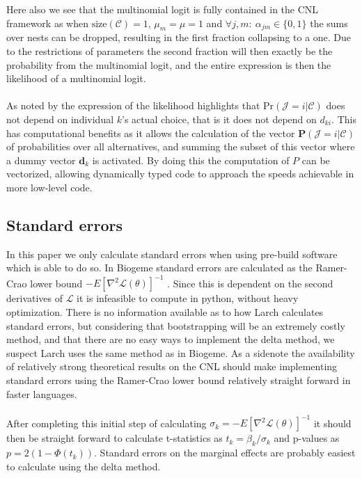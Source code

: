 Here also we see that the multinomial logit is fully contained in the CNL framework as when $\textrm{size}(\mathcal{C}) = 1$, $\mu_m = \mu = 1$ and $\forall j,m: \ \alpha_{jm} \in \{0,1\}$ the sums over nests can be dropped, resulting in the first fraction collapsing to a one. Due to the restrictions of parameters the second fraction will then exactly be the probability from the multinomial logit, and the entire expression is then the likelihood of a multinomial logit.
\\ \\
As noted by \citet{newman_computational_2018} the expression of the likelihood highlights that $\textrm{Pr}(\mathcal{J} = i| \mathcal{C})$ does not depend on individual $k$'s  actual choice, that is it does not depend on $d_{ki}$. This has computational benefits as it allows the calculation of the vector $\bm{P}(\mathcal{J} = i| \mathcal{C})$ of probabilities over all alternatives, and summing the subset of this vector where a dummy vector $\bm{d}_{k}$ is activated. By doing this the computation of $P$ can be vectorized, allowing dynamically typed code to approach the speeds achievable in more low-level code.

\subsection{Standard errors}
In this paper we only calculate standard errors when using pre-build software which is able to do so. In Biogeme standard errors are calculated as the Ramer-Crao lower bound $-E[\nabla^2 \mathcal{L}(\theta)]^{-1}$ \citep{bierlaire_pythonbiogeme:_2016}. Since this is dependent on the second derivatives of $\mathcal{L}$ it is infeasible to compute in python, without heavy optimization. There is no information available as to how Larch calculates standard errors, but considering that bootstrapping will be an extremely costly method, and that there are no easy ways to implement the delta method, we suspect Larch uses the same method as in Biogeme. As a sidenote the availability of relatively strong theoretical results on the CNL should make implementing standard errors using the Ramer-Crao lower bound relatively straight forward in faster languages.
\\ \\
After completing this initial step of calculating $\sigma_k = -E[\nabla^2 \mathcal{L}(\theta)]^{-1}$ it should then be straight forward to calculate t-statistics as $t_k = \beta_k/\sigma_k$ and p-values as $p = 2(1-\Phi(t_k))$. Standard errors on the marginal effects are probably easiest to calculate using the delta method.

